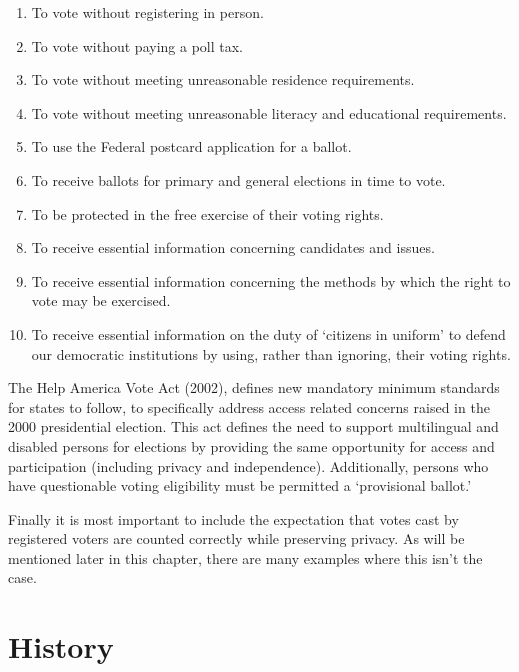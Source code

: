 \begin{enumerate}
  \item To vote without registering in person.
  \item To vote without paying a poll tax.
  \item To vote without meeting unreasonable residence requirements.
  \item To vote without meeting unreasonable literacy and educational
    requirements.
  \item To use the Federal postcard application for a ballot.
  \item To receive ballots for primary and general elections in time to vote.
  \item To be protected in the free exercise of their voting rights.
  \item To receive essential information concerning candidates and issues.
  \item To receive essential information concerning the methods by which the
    right to vote may be exercised.
  \item To receive essential information on the duty of `citizens in uniform'
    to defend our democratic institutions by using, rather than ignoring, their
    voting rights.
\end{enumerate}

The Help America Vote Act (2002), defines new mandatory minimum standards for
states to follow, to specifically address access related concerns raised in the
2000 presidential election. This act defines the need to support multilingual
and disabled persons for elections by  providing the same opportunity for
access and participation (including privacy and independence). Additionally,
persons who have questionable voting eligibility must be permitted a
`provisional ballot.'

Finally it is most important to include the expectation that votes cast by
registered voters are counted correctly while preserving privacy. As will
be mentioned later in this chapter, there are many examples where this
isn't the case.


\section{History}
